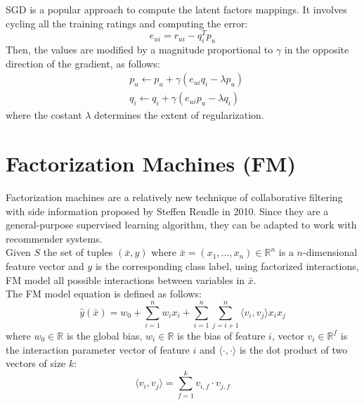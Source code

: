 SGD is a popular approach \cite{ImprovingSVD, 10.1145/1401890.1401944, 10.1145/1345448.1345466} to compute the latent factors mappings. It involves cycling all the training ratings and computing the error:
\begin{equation*}
e_{ui} = r_{ui} - q_i^T p_u
\end{equation*}
Then, the values are modified by a magnitude proportional to $\gamma$ in the opposite direction of the gradient, as follows:
\begin{equation*}
\begin{split}
& p_u \gets p_u + \gamma (e_{ui} q_i - \lambda p_u) \\
& q_i \gets q_i + \gamma (e_{ui} p_u - \lambda q_i)
\end{split}
\end{equation*}
where the costant $\lambda$ determines the extent of regularization.



\section{Factorization Machines (FM)}
\label{sc:factorization-machines}

Factorization machines \cite{10.1109/ICDM.2010.127} are a relatively new technique of collaborative filtering with side information proposed by Steffen Rendle in 2010. Since they are a general-purpose supervised learning algorithm, they can be adapted to work with recommender systems.\\
Given $S$ the set of tuples $(\bar{x}, y)$ where $\bar{x} = (x_1, ..., x_n) \in \mathbb{R}^n$ is a $n$-dimensional feature vector and $y$ is the corresponding class label, using factorized interactions, FM model all possible interactions between variables in $\bar{x}$.\\
The FM model equation is defined as follows:
\begin{equation*}
\hat{y}(\bar{x}) = w_0 + \sum_{i = 1}^{n} w_i x_i + \sum_{i = 1}^{n} \sum_{j = i + 1}^{n} \langle v_i, v_j \rangle x_i x_j
\end{equation*}
where $w_0 \in \mathbb{R}$ is the global bias, $w_i \in \mathbb{R}$ is the bias of feature $i$, vector $v_i \in \mathbb{R}^f$ is the interaction parameter vector of feature $i$ and $\langle \cdot, \cdot \rangle$ is the dot product of two vectors of size $k$:
\begin{equation*}
\langle v_i, v_j \rangle = \sum_{f = 1}^{k} v_{i,f} \cdot v_{j,f}
\end{equation*}



